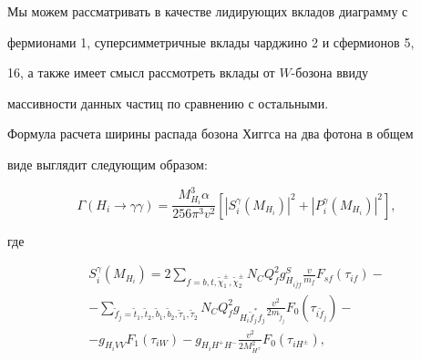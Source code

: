 %






Мы можем рассматривать в качестве лидирующих вкладов диаграмму с

фермионами 1, суперсимметричные вклады чарджино 2 и сфермионов 5,

16, а также имеет смысл рассмотреть вклады от $W$-бозона ввиду

массивности данных частиц по сравнению с остальными.



Формула расчета ширины распада бозона Хиггса на два фотона в общем

виде выглядит следующим образом:



\begin{equation}

\label{eq:gurs:widthH}

\Gamma (H_i \rightarrow \gamma \gamma) = \frac{M^{3}_{H_i}

\alpha}{256 \pi^{3} v^2} \left[ |S^{\gamma}_i(M_{H_i})|^2 +

|P^{\gamma}_i(M_{H_i})|^2 \right],

\end{equation}

где


\begin{multline}\label{eq:gurs:widthH2}



S^{\gamma}_i(M_{H_i}) = 2

\sum_{f=b,t,\tilde{\chi}^{\pm}_{1},\tilde{\chi}^{\pm}_{2}} N_C

Q^{2}_{f} g^{S}_{H_{i \bar{f} f}} \frac{v}{m_f} F_{s f}(\tau_{i

f}) -

\\

- \sum_{\tilde{f}_{j}=\tilde{t}_{1},\tilde{t}_{2},\tilde{b}_{1},\tilde{b}_{2},\tilde{\tau}_{1},\tilde{\tau}_{2}}

N_C Q^{2}_{f} g_{H_{i} \tilde{f}^{*}_{j} f_{j}} \frac{v^2}{2

m_{\tilde{f}_{j}}} F_{0}(\tau_{i \tilde{f}_{j}}) -

\\

-  g_{H_{i} VV} F_1 (\tau_{i W}) - g_{H_{i}H^{+}H^{-}}

\frac{v^2}{2M^{2}_{H^{\pm}}} F_0 (\tau_{i

 H^{\pm}}),

\end{multline} 

